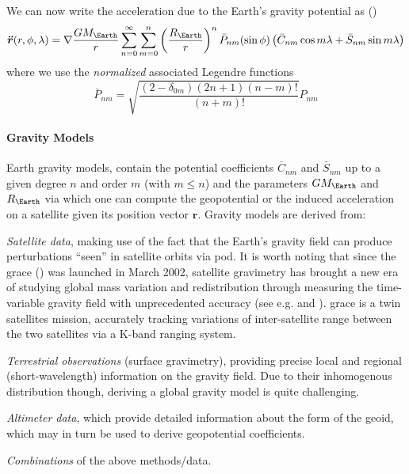We can now write the acceleration due to the Earth's gravity potential as 
(\cite{Montenbruck2000})
\begin{equation}\label{eq:mont315}
  \bm{\ddot{r}} (r, \phi, \lambda ) = \nabla \frac{GM_{\Earth}}{r} \sum_{n=0}^{\infty} \sum_{m=0}^{n} 
    \left(\frac{R_{\Earth}}{r}\right) ^n \bar{P}_{nm} (\sin \phi )
    \left( \bar{C}_{nm} \cos{m\lambda} + \bar{S}_{nm} \sin{m\lambda} \right)
\end{equation}
where we use the \emph{normalized} associated Legendre functions
\begin{equation}
  \bar{P}_{nm} = \sqrt{\frac{\left(2-\delta _{0m}\right) \left(2n+1\right) \left(n-m\right)!}{(n+m)!}} P_{nm}
\end{equation}

\paragraph{Gravity Models}\label{par:gravity-models}

Earth gravity models, contain the potential coefficients $\bar{C}_{nm}$ and $\bar{S}_{nm}$ 
up to a given degree $n$ and order $m$ (with $m \le n$) and the parameters $GM_{\Earth}$ 
and $R_{\Earth}$ via which one can compute the geopotential or the induced acceleration 
on a satellite given its position vector $\bm{r}$. Gravity models are derived from:
\begin{description}
  \item \emph{Satellite data}, making use of the fact that the Earth's gravity field 
    can produce perturbations ``seen'' in satellite orbits via \gls{pod}. It is worth 
    noting that since the \gls{grace} (\cite{Tapley2004b}) was launched 
    in March 2002, satellite gravimetry has brought a new era of studying global mass 
    variation and redistribution through measuring the time-variable gravity field with 
    unprecedented accuracy (see e.g. \cite{Chen2022} and \cite{Jaggi2023}). \gls{grace} is a 
    twin satellites mission, accurately tracking variations of inter-satellite range between 
    the two satellites via a K-band ranging system.
  \item \emph{Terrestrial observations} (surface gravimetry), providing precise local 
    and regional (short-wavelength) information on the gravity field. Due to their 
    inhomogenous distribution though, deriving a global gravity model is quite challenging.
  \item \emph{Altimeter data}, which provide detailed information about the form of the 
    geoid, which may in turn be used to derive geopotential coefficients.
  \item \emph{Combinations} of the above methods/data.
\end{description}

